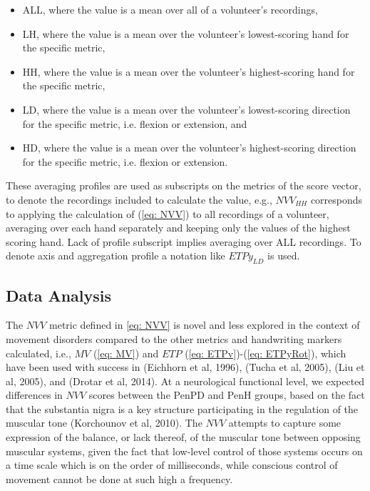 \begin{itemize}
\item ALL, where the value is a mean over all of a volunteer's recordings,
\item LH, where the value is a mean over the volunteer's lowest-scoring hand for the specific metric,
\item HH, where the value is a mean over the volunteer's highest-scoring hand for the specific metric,
\item LD, where the value is a mean over the volunteer's lowest-scoring direction for the specific metric, i.e. flexion or extension, and
\item HD, where the value is a mean over the volunteer's highest-scoring direction for the specific metric, i.e. flexion or extension.
\end{itemize}

These averaging profiles are used as subscripts on the metrics of the score vector, to denote the recordings included to calculate the value, e.g., $NVV_{HH}$ corresponds to applying the calculation of (\ref{eq: NVV}) to all recordings of a volunteer, averaging over each hand separately and keeping only the values of the highest scoring hand. Lack of profile subscript implies averaging over ALL recordings. To denote axis and aggregation profile a notation like $ETPy_{LD}$ is used. 

\subsection{Data Analysis}
\label{subsec:PenCTAnalysis}
The $NVV$ metric defined in \ref{eq: NVV} is novel and less explored in the context of movement disorders compared to the other metrics and handwriting markers calculated, i.e., $MV$ (\ref{eq: MV}) and $ETP$ (\ref{eq: ETPv})-(\ref{eq: ETPyRot}), which have been used with success in (Eichhorn et al, 1996), (Tucha et al, 2005), (Liu et al, 2005), and (Drotar et al, 2014). At a neurological functional level, we expected differences in $NVV$ scores between the \gls{PenPD} and \gls{PenH} groups, based on the fact that the substantia nigra is a key structure participating in the regulation of the muscular tone (Korchounov et al, 2010). The $NVV$ attempts to capture some expression of the balance, or lack thereof, of the muscular tone between opposing muscular systems, given the fact that low-level control of those systems occurs on a time scale which is on the order of milliseconds, while conscious control of movement cannot be done at such high a frequency. 

